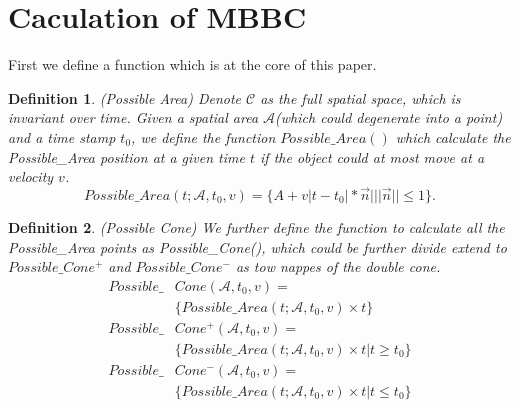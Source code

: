 \documentclass[sigplan]{acmart}
\newtheorem{myDef}{Definition}
\begin{document}
\section{Caculation of MBBC}
First we define a function which is at the core of this paper.
\begin{myDef}
  (Possible Area) Denote $\mathcal{C}$ as the full spatial space, which is invariant over time. Given a spatial area $\mathcal{A}$(which could degenerate into a point) and a time stamp $t_0$, we define the function $Possible\_Area()$ which calculate the Possible\_Area position at a given time $t$ if the object could at most move at a velocity $v$.
  $$
  Possible\_Area(t;\mathcal{A},t_0,v) = \{A+v|t-t_0|*\vec{n} \big| ||\vec{n}|| \leq 1\}.
  $$
\end{myDef}
\begin{myDef}
  (Possible Cone) We further define the function to calculate all the Possible\_Area points as Possible\_Cone(), which could be further divide extend to $Possible\_Cone^+$ and $Possible\_Cone^-$ as tow nappes of the double cone.
  $$
  \begin{aligned}
  Possible\_&Cone(\mathcal{A},t_0,v)=\\
  &\{Possible\_Area(t;\mathcal{A},t_0,v)\times t\}\\
  Possible\_&Cone^+(\mathcal{A},t_0,v)=\\
  &\{Possible\_Area(t;\mathcal{A},t_0,v)\times t \big| t\geq t_0\}\\
  Possible\_&Cone^-(\mathcal{A},t_0,v)=\\
  &\{Possible\_Area(t;\mathcal{A},t_0,v)\times t \big| t\leq t_0\}
  \end{aligned}
  $$
\end{myDef}
\end{document}
